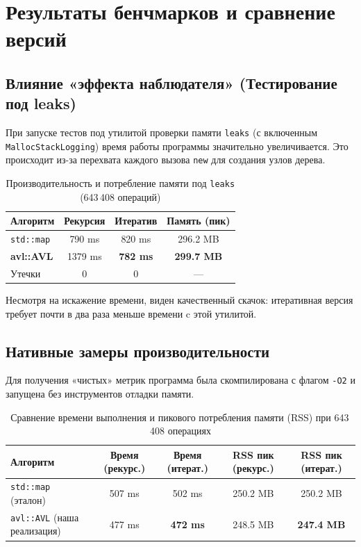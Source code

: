 \section{Результаты бенчмарков и сравнение версий}

\subsection{Влияние «эффекта наблюдателя» (Тестирование под leaks)}

При запуске тестов под утилитой проверки памяти \texttt{leaks} (с включенным \texttt{MallocStackLogging}) время работы программы значительно увеличивается. Это происходит из-за перехвата каждого вызова \texttt{new} для создания узлов дерева.

\begin{table}[h]
\centering
\small
\setlength{\tabcolsep}{6pt}  
\begin{tabular}{|l|c|c|c|}
\hline
\textbf{Алгоритм} & 
\textbf{Рекурсия} & 
\textbf{Итератив} & 
\textbf{Память (пик)} \\
\hline
\texttt{std::map} 
    & 790 ms & 820 ms & 296.2 MB \\
\hline
\textbf{avl::AVL} 
    & 1379 ms & \textbf{782 ms} & \textbf{299.7 MB} \\
\hline
Утечки 
    & 0 & 0 & — \\
\hline
\end{tabular}
\caption{Производительность и потребление памяти под \texttt{leaks} (643\,408 операций)}
\label{tab:leaks}
\end{table}

Несмотря на искажение времени, виден качественный скачок: итеративная версия требует почти в два раза меньше времени c этой утилитой.

\subsection{Нативные замеры производительности}

Для получения «чистых» метрик программа была скомпилирована с флагом \texttt{-O2} и запущена без инструментов отладки памяти.

\begin{table}[h]
\centering
\small
\setlength{\tabcolsep}{5pt}
\begin{tabular}{|l|c|c|c|c|}
\hline
\textbf{Алгоритм} 
    & \textbf{Время (рекурс.)} 
    & \textbf{Время (итерат.)} 
    & \textbf{RSS пик (рекурс.)} 
    & \textbf{RSS пик (итерат.)} \\
\hline
\texttt{std::map} (эталон) 
    & 507 ms & 502 ms & 250.2 MB & 250.2 MB \\
\hline
\texttt{avl::AVL} (наша реализация) 
    & 477 ms & \textbf{472 ms} & 248.5 MB & \textbf{247.4 MB} \\
\hline
\end{tabular}
\caption{Сравнение времени выполнения и пикового потребления памяти (RSS) при 643\,408 операциях}
\label{tab:memory}
\end{table}

